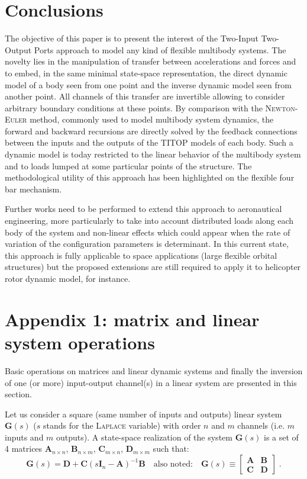 \section{Conclusions}
The objective of this paper is to present the interest of the Two-Input Two-Output Ports approach to model any kind of flexible multibody systems. The novelty lies in the manipulation of transfer between accelerations and forces and to embed, in the same minimal state-space representation, the direct dynamic model of a body seen from one point and the inverse dynamic model seen from another point. All channels of this transfer are invertible allowing to consider arbitrary boundary conditions at these points. By comparison with the \textsc{Newton}-\textsc{Euler} method, commonly used to model multibody system dynamics, the forward and backward recursions are directly solved by the feedback connections between the inputs and the outputs of the TITOP models of each body. Such a dynamic model is today restricted to the linear behavior of the multibody system and to loads lumped at some particular points of the structure. The methodological utility of this approach has been highlighted on the flexible four bar mechanism. 

Further works need to be performed to extend this approach to aeronautical engineering, more particularly to take into account distributed loads along each body of the system and non-linear effects which could appear when the rate of variation of the configuration parameters is determinant. In this current state, this approach is fully applicable to space applications (large flexible orbital structures) but the proposed extensions are still required to apply it to helicopter rotor dynamic model, for instance.

\section*{Appendix 1: matrix and linear system operations}\label{sect:annexe}
Basic operations on matrices and linear dynamic systems and finally the inversion of one (or more) input-output channel(s) in a linear system are presented in this section.

Let us consider a square (same number of inputs and outputs) linear system $\mathbf{G}(s)$ ($s$ stands for the \textsc{Laplace} variable) with order $n$ and $m$ channels (i.e. $m$ inputs and $m$ outputs). A state-space realization of the system $\mathbf{G}(s)$ is a set of 4 matrices $\mathbf{A}_{n \times n}$, $\mathbf{B}_{n \times m}$, $\mathbf{C}_{m \times n}$, $\mathbf{D}_{m \times m}$ such that:
\begin{equation}
\mathbf{G}(s)=\mathbf{D}+\mathbf{C}\left( s\mathbf{I}_n-\mathbf{A}\right)^{-1}\mathbf{B}\quad \mbox{also noted:}\quad \mathbf{G}(s)\equiv \left[\begin{array}{c|c}\mathbf{A} & \mathbf{B} \\ \hline \mathbf{C} & \mathbf{D} \end{array}\right]\;.
\end{equation}

